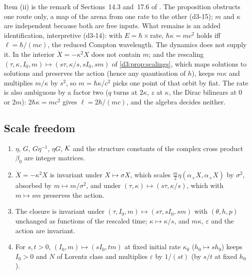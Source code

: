 Item (ii) is the remark of Sections~14.3 and~17.6 of \cite{ES17}. The proposition obstructs one route only, a map of the arena from one rate to the
other (d3-15); $m$ and $\kappa$ are independent because both are free inputs. What remains is an added identification, interpretive (d3-14): with
$E=\hbar\times$rate, $\hbar\kappa=mc^2$ holds iff $\ell=\hbar/(mc)$, the reduced Compton wavelength. The dynamics does not supply it. In the interior
$\ddot X=-\kappa^2X$ does not contain $m$; and the rescaling $(\tau,\kappa,I_0,m)\mapsto(s\tau,\kappa/s,sI_0,sm)$ of \cref{d3:prop:scalings}, which maps
solutions to solutions and preserves the action (hence any quantisation of $h$), keeps $m\kappa$ and multiplies $m/\kappa$ by $s^2$, so
$m=\hbar\kappa/c^2$ picks one point of that orbit by fiat. The rate is also ambiguous by a factor two ($q$ turns at $2\kappa$, $z$ at $\kappa$, the Dirac
bilinears at $0$ or $2m$): $2\hbar\kappa=mc^2$ gives $\ell=2\hbar/(mc)$, and the algebra decides neither.

\subsection{Scale freedom}
\label{d3:sec:scale}

\begin{proposition}[Scalings]
\label{d3:prop:scalings}
\begin{enumerate}[label=(\roman*),leftmargin=2.2em]
\item $\eta$, $G$, $G\eta^{-1}$, $\eta G$, $\mathcal K$ and the structure constants of the complex cross product $\beta_0$ are integer matrices.
\item $\ddot X=-\kappa^2X$ is invariant under $X\mapsto\sigma X$, which scales $\tfrac m2\eta(\alpha_+X,\alpha_+X)$ by $\sigma^2$, absorbed by
$m\mapsto m/\sigma^2$, and under $(\tau,\kappa)\mapsto(s\tau,\kappa/s)$, which with $m\mapsto sm$ preserves the action.
\item The closure is invariant under $(\tau,I_0,m)\mapsto(s\tau,sI_0,sm)$ with $(\theta,h,p)$ unchanged as functions of the rescaled time; $\kappa\mapsto\kappa/s$,
and $m\kappa$, $\varepsilon$ and the action are invariant.
\item For $s,t>0$, $(I_0,m)\mapsto(sI_0,tm)$ at fixed initial rate $\kappa_0$ ($h_0\mapsto sh_0$) keeps $I_0>0$ and $N$ of Lorentz class and multiplies
$\varepsilon$ by $1/(st)$ (by $s/t$ at fixed $h_0$).
\end{enumerate}
\end{proposition}

